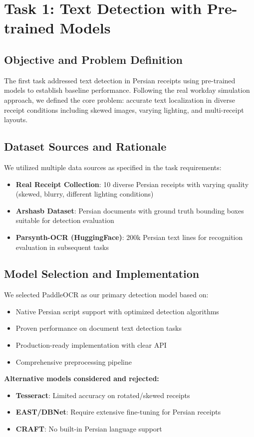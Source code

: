 \documentclass[11pt,a4paper]{article}
\begin{document}
\section{Task 1: Text Detection with Pre-trained Models}

\subsection{Objective and Problem Definition}
The first task addressed text detection in Persian receipts using pre-trained models to establish baseline performance. Following the real workday simulation approach, we defined the core problem: accurate text localization in diverse receipt conditions including skewed images, varying lighting, and multi-receipt layouts.

\subsection{Dataset Sources and Rationale}
We utilized multiple data sources as specified in the task requirements:
\begin{itemize}
  \item \textbf{Real Receipt Collection}: 10 diverse Persian receipts with varying quality (skewed, blurry, different lighting conditions)
  \item \textbf{Arshasb Dataset}: Persian documents with ground truth bounding boxes suitable for detection evaluation
  \item \textbf{Parsynth-OCR (HuggingFace)}: 200k Persian text lines for recognition evaluation in subsequent tasks
\end{itemize}

\subsection{Model Selection and Implementation}
We selected PaddleOCR as our primary detection model based on:
\begin{itemize}
  \item Native Persian script support with optimized detection algorithms
  \item Proven performance on document text detection tasks
  \item Production-ready implementation with clear API
  \item Comprehensive preprocessing pipeline
\end{itemize}

\textbf{Alternative models considered and rejected:}
\begin{itemize}
  \item \textbf{Tesseract}: Limited accuracy on rotated/skewed receipts
  \item \textbf{EAST/DBNet}: Require extensive fine-tuning for Persian receipts
  \item \textbf{CRAFT}: No built-in Persian language support
\end{itemize}
\end{document}
